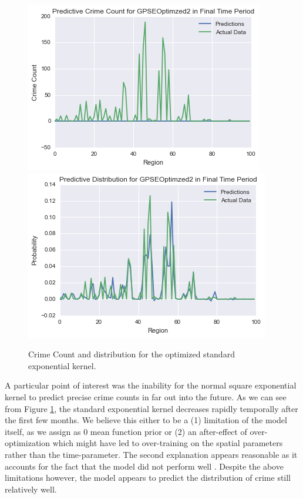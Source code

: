 \documentclass[letterpaper, 11 pt, conference]{ieeeconf}  %
\begin{document}
\begin{figure}
\centering
\includegraphics[scale=0.2]{Optimized_Final_Period_Crime_Count}
\includegraphics[scale=0.2]{Optimized_Final_Period_Distribution}
\caption{Crime Count and distribution for the optimized standard exponential kernel.}
\label{fig:final_period}
\end{figure}
A particular point of interest was the inability for the normal square exponential kernel to predict precise crime counts in far out into the future. As we can see from Figure \ref{fig:final_period}, the standard exponential kernel decreases rapidly temporally after the first few months. We believe this either to be a (1) limitation of the model itself, as we assign as $0$ mean function prior or (2) an after-effect of over-optimization which might have led to over-training on the spatial parameters rather than the time-parameter. The second explanation appears reasonable as it accounts for the fact that the model did not perform well . Despite the above limitations however, the model appears to predict the distribution of crime still relatively well. 
\end{document}
